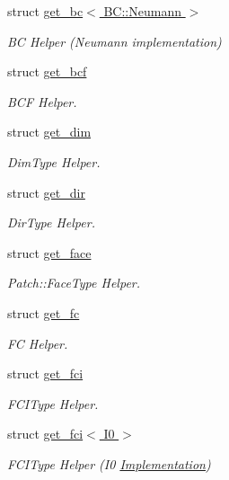 \begin{DoxyCompactItemize}
\item 
struct \hyperlink{structUintah_1_1PhaseField_1_1get__bc_3_01BC_1_1Neumann_01_4}{get\+\_\+bc$<$ B\+C\+::\+Neumann $>$}
\begin{DoxyCompactList}\small\item\em BC Helper (Neumann implementation) \end{DoxyCompactList}\item 
struct \hyperlink{structUintah_1_1PhaseField_1_1get__bcf}{get\+\_\+bcf}
\begin{DoxyCompactList}\small\item\em B\+CF Helper. \end{DoxyCompactList}\item 
struct \hyperlink{structUintah_1_1PhaseField_1_1get__dim}{get\+\_\+dim}
\begin{DoxyCompactList}\small\item\em Dim\+Type Helper. \end{DoxyCompactList}\item 
struct \hyperlink{structUintah_1_1PhaseField_1_1get__dir}{get\+\_\+dir}
\begin{DoxyCompactList}\small\item\em Dir\+Type Helper. \end{DoxyCompactList}\item 
struct \hyperlink{structUintah_1_1PhaseField_1_1get__face}{get\+\_\+face}
\begin{DoxyCompactList}\small\item\em Patch\+::\+Face\+Type Helper. \end{DoxyCompactList}\item 
struct \hyperlink{structUintah_1_1PhaseField_1_1get__fc}{get\+\_\+fc}
\begin{DoxyCompactList}\small\item\em FC Helper. \end{DoxyCompactList}\item 
struct \hyperlink{structUintah_1_1PhaseField_1_1get__fci}{get\+\_\+fci}
\begin{DoxyCompactList}\small\item\em F\+C\+I\+Type Helper. \end{DoxyCompactList}\item 
struct \hyperlink{structUintah_1_1PhaseField_1_1get__fci_3_01I0_01_4}{get\+\_\+fci$<$ I0 $>$}
\begin{DoxyCompactList}\small\item\em F\+C\+I\+Type Helper (I0 \hyperlink{classUintah_1_1PhaseField_1_1Implementation}{Implementation}) \end{DoxyCompactList}\item 

\end{DoxyCompactItemize}
